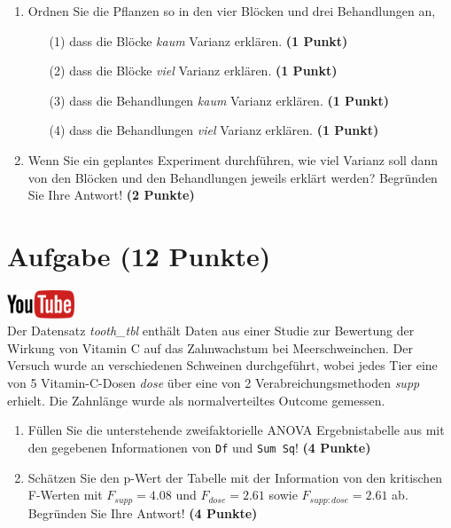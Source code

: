 \documentclass[a4paper, 10pt]{scrartcl}\usepackage[]{graphicx}\usepackage[]{xcolor}
\begin{document}
\begin{enumerate}
\item Ordnen Sie die Pflanzen so in den vier Bl{\"o}cken und drei Behandlungen an,
  \begin{enumerate}
  \item[(1)] dass die Bl{\"o}cke \textit{kaum} Varianz erkl{\"a}ren. \textbf{(1 Punkt)}
  \item[(2)] dass die Bl{\"o}cke \textit{viel} Varianz erkl{\"a}ren. \textbf{(1 Punkt)}  
  \item[(3)] dass die Behandlungen \textit{kaum} Varianz erkl{\"a}ren. \textbf{(1 Punkt)}
  \item[(4)] dass die Behandlungen \textit{viel} Varianz erkl{\"a}ren. \textbf{(1 Punkt)}
  \end{enumerate}
\item Wenn Sie ein geplantes Experiment durchf{\"u}hren, wie viel Varianz soll dann von
  den Bl{\"o}cken und den Behandlungen jeweils erkl{\"a}rt werden? Begr{\"u}nden Sie
  Ihre Antwort! \textbf{(2 Punkte)}
\end{enumerate}
 
\clearpage

\section{Aufgabe \hfill (12 Punkte)}

\hfill\href{https://youtu.be/8Pb2sKUIMyk}{\includegraphics[width =
  2cm]{img/youtube}}\\[1Ex]



Der Datensatz \textit{tooth\_tbl} enth{\"a}lt Daten aus einer Studie zur
Bewertung der Wirkung von Vitamin C auf das Zahnwachstum bei
Meerschweinchen. Der Versuch wurde an verschiedenen Schweinen durchgef{\"u}hrt,
wobei jedes Tier eine von 5 Vitamin-C-Dosen \textit{dose}
{\"u}ber eine von 2 Verabreichungsmethoden \textit{supp}
erhielt. Die Zahnl{\"a}nge wurde als normalverteiltes Outcome gemessen.



\begin{enumerate}
\item F{\"u}llen Sie die unterstehende zweifaktorielle ANOVA Ergebnistabelle aus
  mit den gegebenen Informationen von \texttt{Df} und \texttt{Sum Sq}!
  \textbf{(4 Punkte)}
\item Sch{\"a}tzen Sie den p-Wert der Tabelle mit der Information von den
  kritischen F-Werten mit
  $F_{supp} = 4.08$ und
  $F_{dose} = 2.61$ sowie
  $F_{supp:dose} = 2.61$ ab. Begr{\"u}nden Sie Ihre
  Antwort! \textbf{(4 Punkte)}
\end{enumerate}
\end{document}
